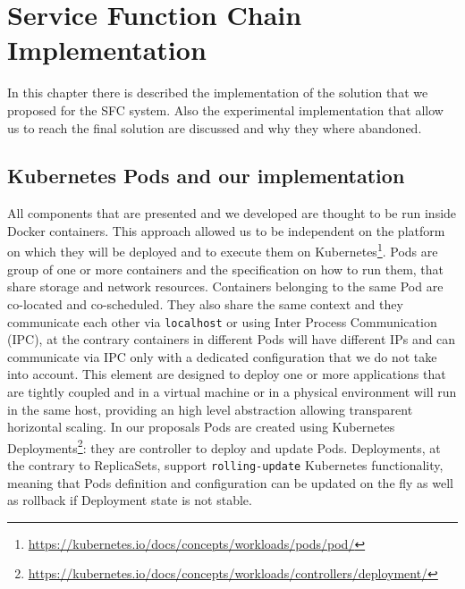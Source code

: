 \chapter{Service Function Chain Implementation}
\label{chap:impl}

\newcommand{\enchainer}{\texttt{Enchainer}}
\newcommand{\vnf}{\texttt{VNF}}
\newcommand{\vnfs}{\texttt{VNFs}}
\newcommand{\dispatcher}{\texttt{Dispatcher}}
\newcommand{\astaire}{\texttt{Astaire}}
\newcommand{\ironhide}{\texttt{Ironhide}}
\newcommand{\harbor}{\texttt{Harbor}}
\newcommand{\roulette}{\texttt{Roulette}}
\newcommand{\ingress}{\texttt{ingress}}
\newcommand{\ingresses}{\texttt{ingresses}}
\newcommand{\egress}{\texttt{egress}}
\newcommand{\egresses}{\texttt{egresses}}

In this chapter there is described the implementation of the solution that we
proposed for the SFC system. Also the experimental implementation that allow us
to reach the final solution are discussed and why they where abandoned.

\section{Kubernetes Pods and our implementation}
All components that are presented and we developed are thought to be run inside
Docker containers. This approach allowed us to be independent on the platform on
which they will be deployed and to execute them on
Kubernetes\footnote{\url{https://kubernetes.io/docs/concepts/workloads/pods/pod/}}.
Pods are group of one or more containers and the specification on how to run
them, that share storage and network resources. Containers belonging to the same
Pod are co-located and co-scheduled. They also share the same context and they
communicate each other via \texttt{localhost} or using Inter Process
Communication (IPC), at the contrary containers in different Pods will have
different IPs and can communicate via IPC only with a dedicated configuration
that we do not take into account. This element are designed to deploy one or
more applications that are tightly coupled and in a virtual machine or in a
physical environment will run in the same host, providing an high level
abstraction allowing transparent horizontal scaling. In our proposals Pods are
created using Kubernetes
Deployments\footnote{\url{https://kubernetes.io/docs/concepts/workloads/controllers/deployment/}}:
they are controller to deploy and update Pods. Deployments, at the contrary to
ReplicaSets, support \texttt{rolling-update} Kubernetes functionality, meaning
that Pods definition and configuration can be updated on the fly as well as
rollback if Deployment state is not stable. 

